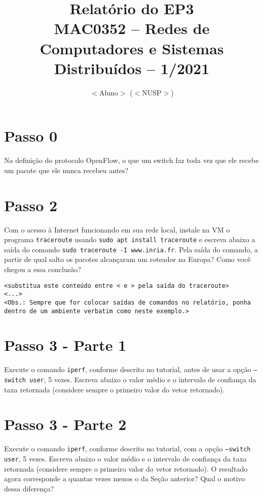 \documentclass[12pt,letterpaper]{article}
\title{Relatório do EP3\\MAC0352 -- Redes de Computadores e Sistemas Distribuídos -- 1/2021}
\author{$<$Aluno$>$ ($<$NUSP$>$)}
\date{}
\begin{document}
\maketitle

\section{Passo 0}

Na definição do protocolo OpenFlow, o que um switch faz toda vez que
ele recebe um pacote que ele nunca recebeu antes?


\section{Passo 2}


Com o acesso à Internet funcionando em sua rede local, instale na VM o
programa \texttt{traceroute} usando \texttt{sudo apt install
traceroute} e escreva abaixo a saída do comando \texttt{sudo
traceroute -I www.inria.fr}. Pela saída do comando, a partir de qual
salto os pacotes alcançaram um roteador na Europa? Como você chegou a
essa conclusão?

\begin{verbatim}
<substitua este conteúdo entre < e > pela saída do traceroute>
<...>
<Obs.: Sempre que for colocar saídas de comandos no relatório, ponha
dentro de um ambiente verbatim como neste exemplo.>
\end{verbatim}

\section{Passo 3 - Parte 1}


Execute o comando \texttt{iperf}, conforme descrito no tutorial, antes
de usar a opção \texttt{--switch user}, 5 vezes.  Escreva abaixo o
valor médio e o intervalo de confiança da taxa retornada (considere
sempre o primeiro valor do vetor retornado).


\section{Passo 3 - Parte 2}


Execute o comando \texttt{iperf}, conforme descrito no tutorial, com a
opção \texttt{--switch user}, 5 vezes. Escreva abaixo o valor médio e
o intervalo de confiança da taxa retornada (considere sempre o
primeiro valor do vetor retornado). O resultado agora corresponde a
quantas vezes menos o da Seção anterior? Qual o motivo dessa
diferença?
\end{document}
